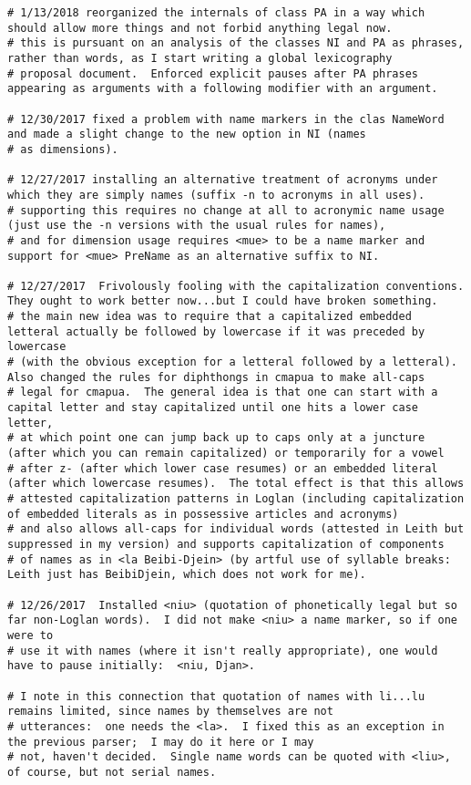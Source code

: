 \documentclass[12pt]{book}
\begin{document}
{\begin{verbatim}
# 1/13/2018 reorganized the internals of class PA in a way which should allow more things and not forbid anything legal now.
# this is pursuant on an analysis of the classes NI and PA as phrases, rather than words, as I start writing a global lexicography
# proposal document.  Enforced explicit pauses after PA phrases appearing as arguments with a following modifier with an argument.

# 12/30/2017 fixed a problem with name markers in the clas NameWord and made a slight change to the new option in NI (names
# as dimensions).

# 12/27/2017 installing an alternative treatment of acronyms under which they are simply names (suffix -n to acronyms in all uses).
# supporting this requires no change at all to acronymic name usage (just use the -n versions with the usual rules for names),
# and for dimension usage requires <mue> to be a name marker and support for <mue> PreName as an alternative suffix to NI.

# 12/27/2017  Frivolously fooling with the capitalization conventions.  They ought to work better now...but I could have broken something.
# the main new idea was to require that a capitalized embedded letteral actually be followed by lowercase if it was preceded by lowercase
# (with the obvious exception for a letteral followed by a letteral).  Also changed the rules for diphthongs in cmapua to make all-caps
# legal for cmapua.  The general idea is that one can start with a capital letter and stay capitalized until one hits a lower case letter,
# at which point one can jump back up to caps only at a juncture (after which you can remain capitalized) or temporarily for a vowel
# after z- (after which lower case resumes) or an embedded literal (after which lowercase resumes).  The total effect is that this allows
# attested capitalization patterns in Loglan (including capitalization of embedded literals as in possessive articles and acronyms)
# and also allows all-caps for individual words (attested in Leith but suppressed in my version) and supports capitalization of components
# of names as in <la Beibi-Djein> (by artful use of syllable breaks:  Leith just has BeibiDjein, which does not work for me).

# 12/26/2017  Installed <niu> (quotation of phonetically legal but so far non-Loglan words).  I did not make <niu> a name marker, so if one were to
# use it with names (where it isn't really appropriate), one would have to pause initially:  <niu, Djan>.

# I note in this connection that quotation of names with li...lu remains limited, since names by themselves are not
# utterances:  one needs the <la>.  I fixed this as an exception in the previous parser;  I may do it here or I may
# not, haven't decided.  Single name words can be quoted with <liu>, of course, but not serial names.


\end{verbatim}}
\end{document}

